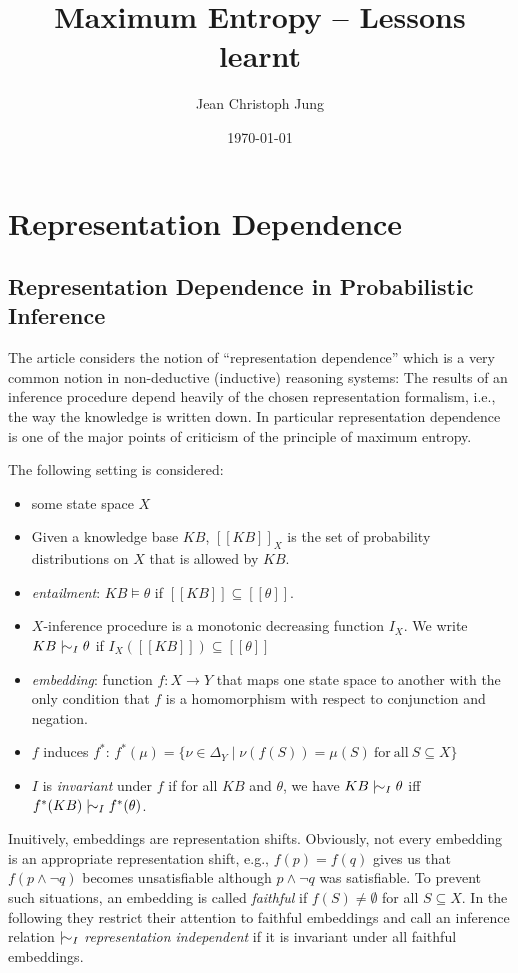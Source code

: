 \documentclass[a4wide]{article}
\title{Maximum Entropy -- Lessons learnt}
\date{\today}
\author{Jean Christoph Jung}
\newcommand{\infers}{\mathrel|\joinrel\sim}
\newcommand{\lsem}{[\![}
\newcommand{\rsem}{]\!]}
\begin{document}
\maketitle

\section{Representation Dependence}

\subsection{Representation Dependence in Probabilistic Inference \cite{HalpernK04}}

The article \cite{HalpernK04} considers the notion of ``representation dependence'' which
is a very common notion in non-deductive (inductive) reasoning systems: The results of an
inference procedure depend heavily of the chosen representation formalism, \mbox{i.e.}, the
way the knowledge is written down. In particular representation dependence is one of the
major points of criticism of the principle of maximum entropy. 

The following setting is considered: 
\begin{itemize}
  \item some state space $X$ 
  \item Given a knowledge base $KB$, $\lsem KB\rsem_X$ is the set of probability distributions on $X$
    that is allowed by $KB$.
  \item \emph{entailment}: $KB\models\theta$ if $\lsem KB\rsem\subseteq \lsem\theta\rsem$.
  \item $X$-inference procedure is a monotonic decreasing function $I_X$. We write $KB\infers_I\theta$ if 
    $I_X(\lsem KB\rsem )\subseteq \lsem\theta\rsem$
  \item \emph{embedding}: function $f:X\rightarrow Y$ that maps one state space to another with the only
    condition that $f$ is a homomorphism with respect to conjunction and negation.
  \item $f$ induces $f^*$: $f^*(\mu)=\{\nu\in\Delta_Y\mid \nu(f(S))=\mu(S)\mathrm{\ for\ all\ } S\subseteq X\}$
  \item $I$ is \emph{invariant} under $f$ if for all $KB$ and $\theta$, we have $KB\infers_I\theta$ iff
    $f^*(KB)\infers_I f^*(\theta)$.
\end{itemize}

Inuitively, embeddings are representation shifts. Obviously, not every embedding is
an appropriate representation shift, \mbox{e.g.}, $f(p)=f(q)$ gives us that $f(p\wedge\neg q)$
becomes unsatisfiable although $p\wedge\neg q$ was satisfiable. To prevent such situations,
an embedding is called \emph{faithful} if $f(S)\neq\emptyset$ for all $S\subseteq X$.
In the following they restrict their attention to faithful embeddings and call an inference relation
$\infers_I$ \emph{representation independent} if it is invariant under all faithful embeddings. 
\end{document}
